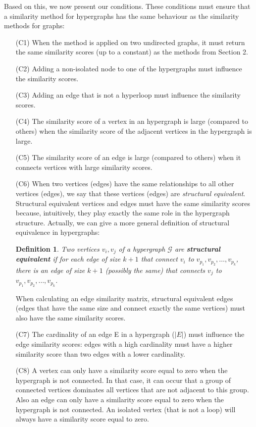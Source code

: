 \documentclass[a4paper,11pt]{report}
\newtheorem{definition}[theorem]{Definition}
\newcommand{\hgraf}{\mathcal{G}}
\begin{document}
 
Based on this, we now present our conditions. These conditions must ensure that 
a similarity method for hypergraphs has the same behaviour as the similarity 
methods for graphs:
\begin{itemize}
  \item[(C1)] When the method is applied on two undirected graphs, it must return the same 
  similarity scores (up to a constant) as the methods from Section 2.
  \item[(C2)] Adding a non-isolated node to one of the hypergraphs must influence 
  the similarity scores.
  \item[(C3)] Adding an edge that is not a hyperloop 
  must influence the similarity scores.
  \item[(C4)] The similarity score of a vertex in an hypergraph is large (compared to others) when the similarity score 
  of the adjacent vertices in the hypergraph is large.
  \item[(C5)] The similarity score of an edge is large (compared to others) when it connects vertices 
  with large similarity scores.
  \item[(C6)] When two vertices (edges) have the same relationships to all other vertices (edges), we say 
  that these vertices (edges) are \emph{structural equivalent}.  Structural equivalent vertices and edges must have 
  the same similarity scores because, intuitively, they play exactly the same role in the hypergraph structure. 
  Actually, we can give a more general definition of structural equivalence in 
  hypergraphs:

\begin{definition}\label{definterhyp}
    Two vertices $v_i, v_j$ of a hypergraph $\hgraf$ are \textbf{structural equivalent}
  if for each edge of size $k+1$ that connect $v_i$ to $v_{p_1}, v_{p_2},\ldots, v_{p_k}$, there is an edge of size $k+1$ (possibly the same) that connects
  $v_j$ to $v_{p_1}, v_{p_2},\ldots, v_{p_k}$.  \end{definition}

 When calculating 
  an edge similarity matrix, structural equivalent edges (edges that have the same size and connect exactly the same vertices) 
  must also have the same similarity 
  scores.
  


  \item[(C7)] The cardinality of an edge E in a hypergraph ($|E|$) must 
  influence the edge similarity scores: edges with a high cardinality must have a higher similarity score than two edges with a lower cardinality.
      \item[(C8)] A vertex can only have a similarity score equal to zero when the hypergraph is not connected. In that case, 
  it can occur that a group of connected vertices dominates all vertices that are not adjacent to this group. 
  Also an edge can only have a similarity score equal to zero when the hypergraph is not connected. 
  An isolated vertex (that is not a loop) will always have a similarity score equal 
  to zero. 
  \end{itemize}
\end{document}
